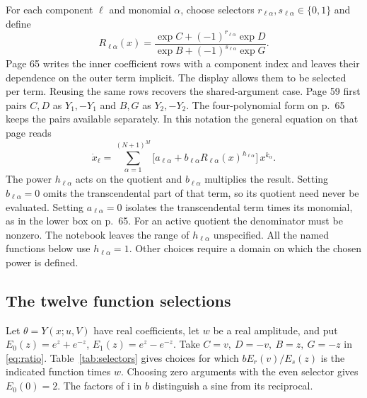 \documentclass[11pt,letterpaper]{article}
\newcommand{\ii}{\mathrm{i}}
\begin{document}
For each component \(\ell\) and monomial \(\alpha\), choose selectors
\(r_{\ell\alpha},s_{\ell\alpha}\in\{0,1\}\) and define
\begin{equation}\label{eq:ratio}
 R_{\ell\alpha}(x)=
 \frac{\exp C+(-1)^{r_{\ell\alpha}}\exp D}
      {\exp B+(-1)^{s_{\ell\alpha}}\exp G}.
\end{equation}
Page 65 writes the inner coefficient rows with a component index and leaves
their dependence on the outer term implicit. The display allows them to be
selected per term. Reusing the same rows recovers the shared-argument case.
Page 59 first pairs \(C,D\) as \(Y_1,-Y_1\) and \(B,G\) as \(Y_2,-Y_2\).
The four-polynomial form on p.~65 keeps the pairs available separately. In
this notation the general equation on that page reads
\begin{equation}\label{eq:general}
 \boxed{\displaystyle
 \dot x_\ell=\sum_{\alpha=1}^{(N+1)^M}
 \big[a_{\ell\alpha}+b_{\ell\alpha}R_{\ell\alpha}(x)^{h_{\ell\alpha}}\big]\,
 x^{k_\alpha}.}
\end{equation}
The power \(h_{\ell\alpha}\) acts on the quotient and \(b_{\ell\alpha}\)
multiplies the result. Setting \(b_{\ell\alpha}=0\) omits the transcendental
part of that term, so its quotient need never be evaluated. Setting
\(a_{\ell\alpha}=0\) isolates the transcendental term times its monomial,
as in the lower box on p.~65. For an active quotient the denominator must
be nonzero. The notebook leaves the range of \(h_{\ell\alpha}\) unspecified.
All the named functions below use \(h_{\ell\alpha}=1\). Other choices require
a domain on which the chosen power is defined.

\subsection{The twelve function selections}
Let \(\theta=Y(x;u,V)\) have real coefficients, let \(w\) be a real
amplitude, and put \(E_0(z)=e^z+e^{-z}\), \(E_1(z)=e^z-e^{-z}\).
Take \(C=v,\ D=-v,\ B=z,\ G=-z\) in \eqref{eq:ratio}. Table~\ref{tab:selectors}
gives choices for which \(bE_r(v)/E_s(z)\) is the indicated function times
\(w\). Choosing zero arguments with the even selector gives \(E_0(0)=2\).
The factors of \(\ii\) in \(b\) distinguish a sine from its reciprocal.
\end{document}
